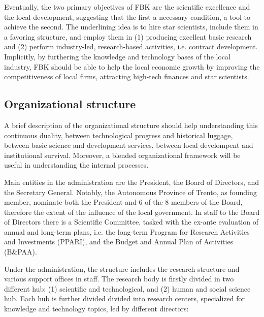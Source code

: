 Eventually, the two primary objectives of FBK are the scientific excellence and the local development, suggesting that the first a necessary condition, a tool to achieve the second. The underlining idea is to hire star scientists, include them in a favoring structure, and employ them in (1) producing excellent basic research and (2) perform industry-led, research-based activities, i.e. contract development. Implicitly, by furthering the knowledge and technology bases of the local industry, FBK should be able to help the local economic growth by improving the competitiveness of local firms, attracting high-tech finances and star scientists.

\subsection{Organizational structure}

A brief description of the organizational structure should help understanding this continuous duality, between technological progress and historical luggage, between basic science and development services, between local develompent and institutional survival. Moreover, a blended organizational framework will be useful in understanding the internal processes. 

Main entities in the administration are the President, the Board of Directors, and the Secretary General. Notably, the Autonomous Province of Trento, as founding member, nominate both the President and 6 of the 8 members of the Board, therefore the extent of the influence of the local government. In staff to the Board of Directors there is a Scientific Committee, tasked with the ex-ante evaluation of annual and long-term plans, i.e. the long-term Program for Research Activities and Investments (PPARI), and the Budget and Annual Plan of Activities (B\&PAA).

Under the administration, the structure includes the research structure and various support offices in staff. The research body is firstly divided in two different hub: (1) scientific and technological, and (2) human and social science hub. Each hub is further divided divided into research centers, specialized for knowledge and technology topics, led by different directors:

